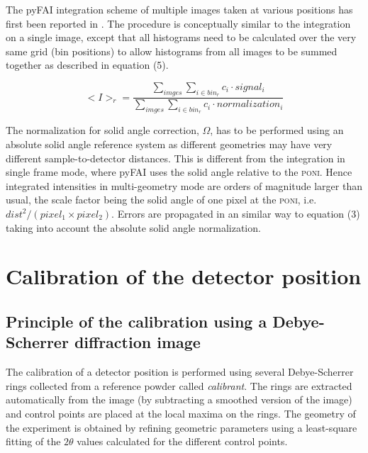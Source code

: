 \documentclass[preprint]{iucr}              %
\begin{document}
The pyFAI integration scheme of multiple images taken at various positions has
first been reported in . 
The procedure is conceptually similar to the integration on a single image,
except that all histograms need to be calculated over the very same
grid (bin positions) to allow histograms from all images to be summed together as described in equation (5). 

\begin{equation}
<I>_{r} = \frac{\sum\limits_{imges} \sum\limits_{i \in bin_r} c_i \cdot
signal_i} {\sum\limits_{imges} \sum\limits_{i \in bin_r} c_i \cdot
normalization_i} 
\end{equation}

The normalization for solid angle correction, $\Omega$, has to be performed
using an absolute solid angle reference system as different geometries may 
have very different sample-to-detector distances.
This is different from the integration in single frame mode, where pyFAI uses 
the solid angle relative to the \textsc{poni}. 
Hence integrated intensities in multi-geometry mode are orders of
magnitude larger than usual, the scale factor being the solid angle of one pixel
at the \textsc{poni}, i.e. $dist^2/(pixel_1\times pixel_2)$.
Errors are propagated in an similar way to equation (3) taking into account the 
absolute solid angle normalization.
\section{Calibration of the detector position}

\subsection{Principle of the calibration using a Debye-Scherrer diffraction
image}
The calibration of a detector position is performed using several Debye-Scherrer
rings collected from a reference powder called \textit{calibrant}.
The rings are extracted automatically from the image (by subtracting a smoothed 
version of the image) and control points are placed at the
local maxima on the rings.
The geometry of the experiment is obtained by refining geometric parameters using 
a least-square fitting of the $2\theta$ values calculated for the different control points.
\end{document}
